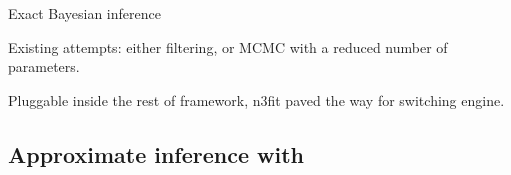 
Exact Bayesian inference

Existing attempts: either filtering, or MCMC with a reduced number of
parameters.

Pluggable inside the rest of \nnpdf framework, n3fit paved the way for
switching engine.

\subsection{Approximate inference with \lsqfitgp}
